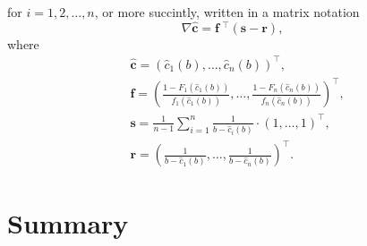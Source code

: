 for $i=1,2,\dotsc,n$, or more succintly, written in a matrix notation
\begin{equation}
  \label{eq:foc_ode_matrix_numerical}
  \nabla\mathbf{\hat{c}} = \mathbf{f}\:^\intercal (\mathbf{s} - \mathbf{r}),
\end{equation}
where
\begin{align*} 
  &\mathbf{\hat{c}} = (\hat{c}_1(b),\dotsc,\hat{c}_n(b))^\intercal,\\
  &\mathbf{f} = \left(\frac{1-F_1(\hat{c}_1(b))}{f_1(\hat{c}_1(b))},\dotsc,\frac{1-F_n(\hat{c}_n(b))}{f_n(\hat{c}_n(b))}\right)^\intercal,\\
  &\mathbf{s} = \frac{1}{n-1}\sum_{i=1}^n\frac{1}{b-\hat{c}_i(b)}\cdot (1,\dotsc,1)^\intercal,\\
  &\mathbf{r} = \left(\frac{1}{b-\hat{c}_1(b)},\dotsc,\frac{1}{b-\hat{c}_n(b)}\right)^\intercal.
\end{align*}

\section{Summary}
\label{sec:summary_numerical}

